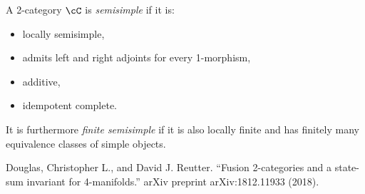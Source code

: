 \documentclass[12pt]{article}
\begin{document}
\begin{definition}
A 2-category $\cC$ is \emph{semisimple}
if it is:
\begin{itemize}
\item locally semisimple,
\item admits left and right adjoints for every 1-morphism,
\item additive,
\item idempotent complete.
\end{itemize}

It is furthermore \emph{finite semisimple}
if it is also locally finite and
has finitely many equivalence classes of simple objects.
\end{definition}

\begin{thebibliography}{1}

 Douglas, Christopher L., and David J. Reutter. ``Fusion
2-categories and a state-sum invariant for 4-manifolds.'' arXiv preprint arXiv:1812.11933 (2018).

\end{thebibliography}
\end{document}
